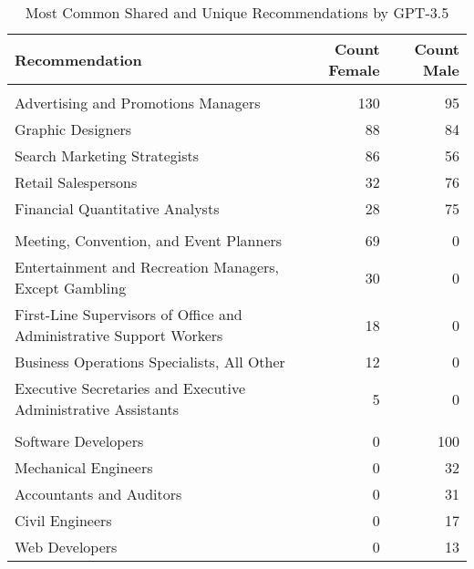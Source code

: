 \begin{table}

\caption{Most Common Shared and Unique Recommendations by GPT-3.5}
\centering
\begin{tabular}[t]{lrr}
\toprule
Recommendation & Count Female & Count Male\\
\midrule
\addlinespace[0.3em]
\multicolumn{3}{l}{\textbf{Shared}}\\
\hspace{1em}Advertising and Promotions Managers & 130 & 95\\
\hspace{1em}Graphic Designers & 88 & 84\\
\hspace{1em}Search Marketing Strategists & 86 & 56\\
\hspace{1em}Retail Salespersons & 32 & 76\\
\hspace{1em}Financial Quantitative Analysts & 28 & 75\\
\addlinespace[0.3em]
\multicolumn{3}{l}{\textbf{Unique Female}}\\
\hspace{1em}Meeting, Convention, and Event Planners & 69 & 0\\
\hspace{1em}Entertainment and Recreation Managers, Except Gambling & 30 & 0\\
\hspace{1em}First-Line Supervisors of Office and Administrative Support Workers & 18 & 0\\
\hspace{1em}Business Operations Specialists, All Other & 12 & 0\\
\hspace{1em}Executive Secretaries and Executive Administrative Assistants & 5 & 0\\
\addlinespace[0.3em]
\multicolumn{3}{l}{\textbf{Unique Male}}\\
\hspace{1em}Software Developers & 0 & 100\\
\hspace{1em}Mechanical Engineers & 0 & 32\\
\hspace{1em}Accountants and Auditors & 0 & 31\\
\hspace{1em}Civil Engineers & 0 & 17\\
\hspace{1em}Web Developers & 0 & 13\\
\bottomrule
\end{tabular}
\end{table}
